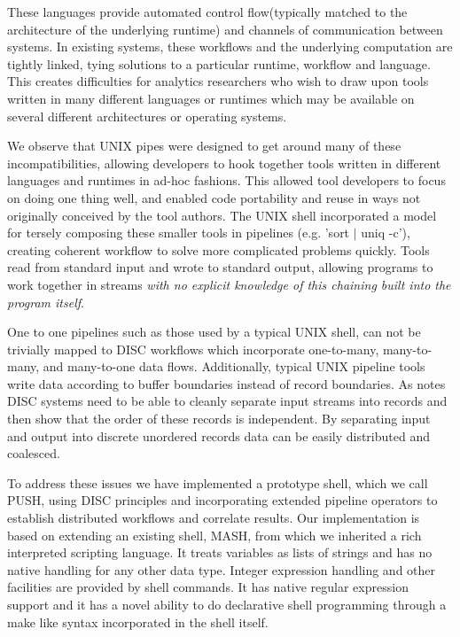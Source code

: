 \documentclass{sig-alt-release2}
\begin{document}
These languages provide automated control flow(typically matched to the 
architecture of the underlying runtime) and channels of communication between 
systems.
In existing systems, these workflows and the underlying computation are 
tightly linked, tying solutions to a particular runtime, workflow and language.
This creates difficulties for analytics researchers who wish to draw upon
tools written in many different languages or runtimes which may be available
on several different architectures or operating systems.

We observe that UNIX pipes were designed to get around 
many of these incompatibilities, allowing developers to hook together tools 
written in different languages and runtimes in ad-hoc fashions.  
This allowed tool developers to focus on doing one thing well, and
enabled code portability and reuse in ways not originally conceived by
the tool authors.  The UNIX shell incorporated a model for tersely composing 
these smaller tools in pipelines (e.g. 'sort $|$ uniq -c'),  
creating coherent workflow to solve more complicated problems 
quickly. 
Tools read from standard input and wrote to standard output, allowing programs 
to work together in streams \emph{with no explicit knowledge of this chaining
built into the program itself}.

One to one pipelines such as those used by a typical UNIX shell, can not be 
trivially mapped to DISC workflows which incorporate one-to-many, many-to-many,
and many-to-one data flows. 
Additionally, typical UNIX pipeline tools write data according to buffer 
boundaries instead of record boundaries.
As \cite{pike2005idp} notes DISC systems need to be able to cleanly separate 
input streams into records and then show that the order of these records is 
independent. 
By separating input and output into discrete unordered records data can be 
easily distributed and coalesced.

To address these issues we have implemented a prototype shell, 
which we call PUSH, using DISC principles and incorporating extended 
pipeline operators to establish distributed workflows and correlate results.
Our implementation is based on extending an existing shell, MASH, 
from which we inherited a rich interpreted scripting language. 
It treats variables as lists of strings and has no native handling for any 
other data type. 
Integer expression handling and other facilities are provided by shell commands. 
It has native regular expression support and it has a novel ability to do 
declarative shell programming through a make like syntax incorporated in the 
shell itself.
\end{document}
